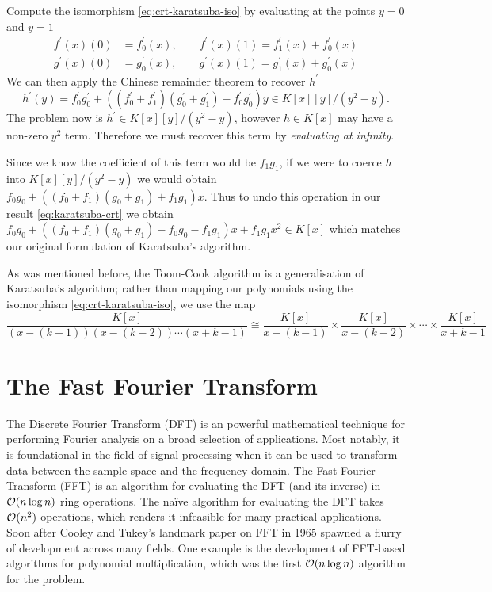 Compute the isomorphism \eqref{eq:crt-karatsuba-iso} by evaluating at the points $y = 0$ and $y = 1$
\begin{align*}
    f^\prime(x)(0) &= f^\prime_0(x), \qquad f^\prime(x)(1) = f^\prime_1(x) + f^\prime_0(x)\\
    g^\prime(x)(0) &= g^\prime_0(x), \qquad g^\prime(x)(1) = g^\prime_1(x) + g^\prime_0(x)
\end{align*}
We can then apply the Chinese remainder theorem to recover $h^\prime$
\begin{equation}\label{eq:karatsuba-crt}
    h^\prime(y) = f^\prime_0g^\prime_0 + ((f^\prime_0 + f^\prime_1)(g^\prime_0 + g^\prime_1) - f^\prime_0g^\prime_0)y \in K[x][y]/(y^2 - y).
\end{equation}
The problem now is $h^\prime \in K[x][y]/(y^2 - y)$, however $h \in K[x]$ may have a non-zero $y^2$ term. Therefore we must recover this term by \emph{evaluating at infinity}. 

Since we know the coefficient of this term would be $f_1g_1$, if we were to coerce $h$ into $K[x][y]/(y^2 - y)$ we would obtain $f_0g_0 + ((f_0 + f_1)(g_0 + g_1) + f_1g_1)x$. Thus to undo this operation in our result \eqref{eq:karatsuba-crt} we obtain $f_0g_0 + ((f_0 + f_1)(g_0 + g_1) - f_0g_0 - f_1g_1)x + f_1g_1x^2 \in K[x]$ which matches our original formulation of Karatsuba's algorithm.

As was mentioned before, the Toom-Cook algorithm is a generalisation of Karatsuba's algorithm; rather than mapping our polynomials using the isomorphism \eqref{eq:crt-karatsuba-iso}, we use the map\cite{summary-poly-mult}
\[
    \frac{K[x]}{(x - (k - 1))(x - (k - 2))\cdots (x + k - 1)} \cong \frac{K[x]}{x - (k - 1)} \times \frac{K[x]}{x - (k - 2)} \times \cdots \times \frac{K[x]}{x + k - 1}
\]

\section{The Fast Fourier Transform}


The Discrete Fourier Transform (DFT) is an powerful mathematical technique for performing Fourier analysis on a broad selection of applications. Most notably, it is foundational in the field of signal processing when it can be used to transform data between the sample space and the frequency domain. The Fast Fourier Transform (FFT) is an algorithm for evaluating the DFT (and its inverse) in $\mathcal O(n \log n)$ ring operations. The na\"{i}ve algorithm for evaluating the DFT takes $\mathcal O(n^2)$ operations, which renders it infeasible for many practical applications. Soon after Cooley and Tukey's landmark paper on FFT in 1965\cite{fft} spawned a flurry of development across many fields. One example is the development of FFT-based algorithms for polynomial multiplication, which was the first $\mathcal O(n \log n)$ algorithm for the problem.



